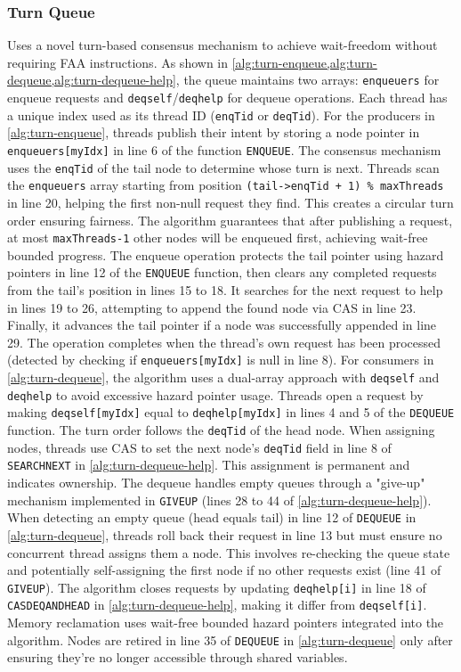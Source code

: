 \subsubsection{Turn Queue} 
Uses a novel turn-based consensus mechanism to achieve wait-freedom without requiring \ac{FAA} instructions. As shown in \cref{alg:turn-enqueue,alg:turn-dequeue,alg:turn-dequeue-help}, the queue maintains two arrays: \texttt{enqueuers} for enqueue requests and \texttt{deqself}/\texttt{deqhelp} for dequeue operations. Each thread has a unique index used as its thread ID (\texttt{enqTid} or \texttt{deqTid}). For the producers in \cref{alg:turn-enqueue}, threads publish their intent by storing a node pointer in \texttt{enqueuers[myIdx]} in line 6 of the function \texttt{ENQUEUE}. The consensus mechanism uses the \texttt{enqTid} of the tail node to determine whose turn is next. Threads scan the \texttt{enqueuers} array starting from position \texttt{(tail->enqTid + 1) \% maxThreads} in line 20, helping the first non-null request they find. This creates a circular turn order ensuring fairness. The algorithm guarantees that after publishing a request, at most \texttt{maxThreads-1} other nodes will be enqueued first, achieving wait-free bounded progress. The enqueue operation protects the tail pointer using hazard pointers in line 12 of the \texttt{ENQUEUE} function, then clears any completed requests from the tail's position in lines 15 to 18. It searches for the next request to help in lines 19 to 26, attempting to append the found node via \ac{CAS} in line 23. Finally, it advances the tail pointer if a node was successfully appended in line 29. The operation completes when the thread's own request has been processed (detected by checking if \texttt{enqueuers[myIdx]} is null in line 8). For consumers in \cref{alg:turn-dequeue}, the algorithm uses a dual-array approach with \texttt{deqself} and \texttt{deqhelp} to avoid excessive hazard pointer usage. Threads open a request by making \texttt{deqself[myIdx]} equal to \texttt{deqhelp[myIdx]} in lines 4 and 5 of the \texttt{DEQUEUE} function. The turn order follows the \texttt{deqTid} of the head node. When assigning nodes, threads use \ac{CAS} to set the next node's \texttt{deqTid} field in line 8 of \texttt{SEARCHNEXT} in \cref{alg:turn-dequeue-help}. This assignment is permanent and indicates ownership. The dequeue handles empty queues through a "give-up" mechanism implemented in \texttt{GIVEUP} (lines 28 to 44 of \cref{alg:turn-dequeue-help}). When detecting an empty queue (head equals tail) in line 12 of \texttt{DEQUEUE} in \cref{alg:turn-dequeue}, threads roll back their request in line 13 but must ensure no concurrent thread assigns them a node. This involves re-checking the queue state and potentially self-assigning the first node if no other requests exist (line 41 of \texttt{GIVEUP}). The algorithm closes requests by updating \texttt{deqhelp[i]} in line 18 of \texttt{CASDEQANDHEAD} in \cref{alg:turn-dequeue-help}, making it differ from \texttt{deqself[i]}. Memory reclamation uses wait-free bounded hazard pointers integrated into the algorithm. Nodes are retired in line 35 of \texttt{DEQUEUE} in \cref{alg:turn-dequeue} only after ensuring they're no longer accessible through shared variables. 